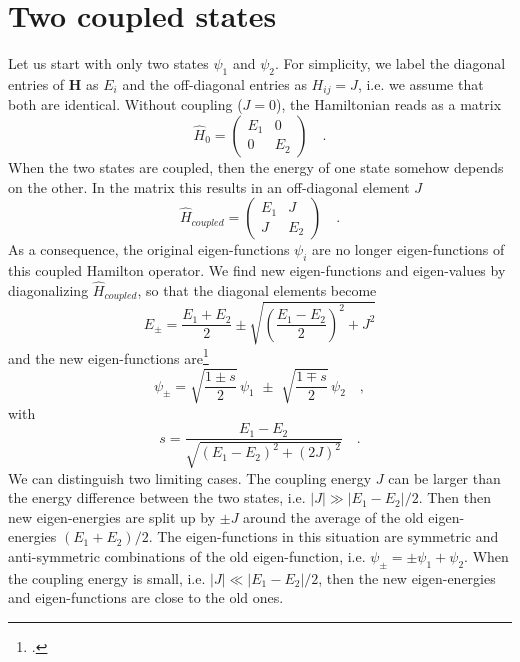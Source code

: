 \section{Two coupled states}

Let us start with only two states $\psi_1$ and $\psi_2$. For simplicity, we label the diagonal entries of $\mathbf{H}$ as $E_i$ and the off-diagonal entries as $H_{ij} = J$, i.e. we assume that both are identical. Without coupling ($J=0$), the Hamiltonian reads as a matrix
\begin{equation}
\hat{H}_0 = \begin{pmatrix} E_1 & 0 \\ 0 & E_2 \end{pmatrix} 
     \quad .
\end{equation}
 When the two states are coupled, then the energy of one state somehow depends on the other. In the matrix this results in an  off-diagonal element $J$
\begin{equation}
\hat{H}_{coupled} = \begin{pmatrix} E_1 & J \\ J & E_2 \end{pmatrix} 
\quad . 
\end{equation}
As a consequence, the original eigen-functions $\psi_i$ are no longer eigen-functions of this coupled Hamilton operator. We find new eigen-functions and eigen-values by diagonalizing $\hat{H}_{coupled}$, so that the diagonal elements become
\begin{equation}
 E_\pm = \frac{E_1 + E_2}{2} \pm \sqrt{ \left( \frac{E_1 - E_2}{2} \right)^2 + J^2 }
\end{equation}
and the new eigen-functions are\footcite[eq. 8.10]{Parson}
\begin{equation}
 \psi_{\pm} = 
\sqrt{\frac{1 \pm s}{2}} \, \psi_1 \, \, \pm \, \, \sqrt{\frac{1 \mp s}{2}}  \, \psi_2 \quad ,
\end{equation}
with
\begin{equation}
s = \frac{E_1 - E_2}{\sqrt{(E_1 - E_2)^2 + (2J)^2}} \quad .
\end{equation}
We can distinguish two limiting cases. The coupling energy $J$ can be larger than the energy difference between the two states, i.e. $|J| \gg |E_1 - E_2| / 2$. Then then new eigen-energies are split up by $\pm J$ around the average of the old eigen-energies $(E_1 + E_2) /2$. The eigen-functions in this situation are symmetric and anti-symmetric combinations of the old eigen-function, i.e. $\psi_\pm = \pm \psi_1 + \psi_2$. When the coupling energy is small, i.e. $|J| \ll |E_1 - E_2| / 2$, then the new eigen-energies and eigen-functions are close to the old ones.


